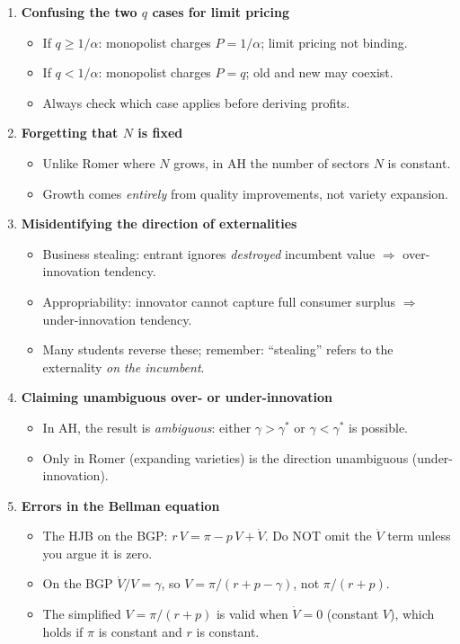 \documentclass[a4paper,11pt]{article}
\begin{document}
\begin{enumerate}
    \item \textbf{Confusing the two $q$ cases for limit pricing}
    \begin{itemize}
        \item If $q \geq 1/\alpha$: monopolist charges $P = 1/\alpha$; limit pricing not binding.
        \item If $q < 1/\alpha$: monopolist charges $P = q$; old and new may coexist.
        \item Always check which case applies before deriving profits.
    \end{itemize}

    \item \textbf{Forgetting that $N$ is fixed}
    \begin{itemize}
        \item Unlike Romer where $N$ grows, in AH the number of sectors $N$ is constant.
        \item Growth comes \emph{entirely} from quality improvements, not variety expansion.
    \end{itemize}

    \item \textbf{Misidentifying the direction of externalities}
    \begin{itemize}
        \item Business stealing: entrant ignores \emph{destroyed} incumbent value $\Rightarrow$ over-innovation tendency.
        \item Appropriability: innovator cannot capture full consumer surplus $\Rightarrow$ under-innovation tendency.
        \item Many students reverse these; remember: ``stealing'' refers to the externality \emph{on the incumbent}.
    \end{itemize}

    \item \textbf{Claiming unambiguous over- or under-innovation}
    \begin{itemize}
        \item In AH, the result is \emph{ambiguous}: either $\gamma > \gamma^*$ or $\gamma < \gamma^*$ is possible.
        \item Only in Romer (expanding varieties) is the direction unambiguous (under-innovation).
    \end{itemize}

    \item \textbf{Errors in the Bellman equation}
    \begin{itemize}
        \item The HJB on the BGP: $r\,V = \pi - p\,V + \dot{V}$. Do NOT omit the $\dot{V}$ term unless you argue it is zero.
        \item On the BGP $\dot{V}/V = \gamma$, so $V = \pi/(r + p - \gamma)$, not $\pi/(r+p)$.
        \item The simplified $V = \pi/(r+p)$ is valid when $\dot{V} = 0$ (constant $V$), which holds if $\pi$ is constant and $r$ is constant.
    \end{itemize}


\end{enumerate}
\end{document}
